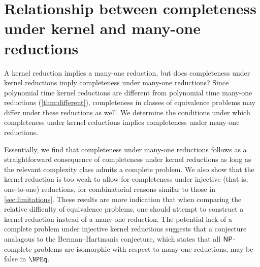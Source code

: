 \section
    [Relationship between completeness under kernel and many-one reductions]
    {Relationship between completeness \\ under kernel and many-one reductions}
\label{sec:npeqcompleteness}
%
A kernel reduction implies a many-one reduction, but does completeness under kernel reductions imply completeness under many-one reductions?
Since polynomial time kernel reductions are different from polynomial time many-one reductions (\autoref{thm:different}), completeness in classes of equivalence problems may differ under these reductions as well.
We determine the conditions under which completeness under kernel reductions implies completeness under many-one reductions.

%
Essentially, we find that completeness under many-one reductions follows as a straightforward consequence of completeness under kernel reductions as long as the relevant complexity class admits a complete problem.
We also show that the kernel reduction is too weak to allow for completeness under injective (that is, one-to-one) reductions, for combinatorial reasons similar to those in \autoref{sec:limitations}.
These results are more indication that when comparing the relative difficulty of equivalence problems, one should attempt to construct a kernel reduction instead of a many-one reduction.
The potential lack of a complete problem under injective kernel reductions suggests that a conjecture analagous to the Berman--Hartmanis conjecture, which states that all ${\mathsf{NP}}$-complete problems are isomorphic with respect to many-one reductions, may be false in $\NPEq$.

